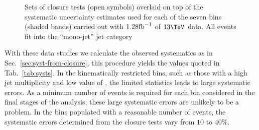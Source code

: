 \begin{figure}[h!]
  \begin{center}
    \caption{Sets of closure tests (open symbols) overlaid on top of
      the systematic uncertainty estimates used for each of the seven
      \scalht bins (shaded bands) carried out with $1.28\text{fb}^{-1}$ of
      $13\tev$ data. All events fit into the ``mono-jet'' jet
      category}
    \label{fig:closureDataMono}
  \end{center} 
\end{figure}



With these data studies we calculate the observed systematics as in
Sec.~\ref{sec:syst-from-closure},
this procedure yields the values quoted in
Tab.~\ref{tab:systs}. In the kinematically restricted bins, such
as those with a high jet multiplicity and low value of \scalht, the
limited statistics leads to large systematic errors. As a minimum number of
events is required for each bin considered in the final stages of the
analysis, these large systematic errors are unlikely to be a problem.
In the bins populated with a reasonable number of events, the
systematic errors determined from the closure tests vary from $10$ to
$40\%$.


